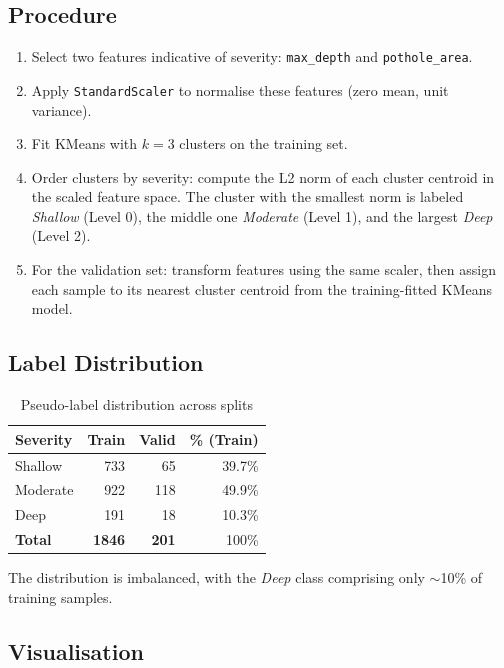 \documentclass[12pt, a4paper]{article}
\begin{document}
\subsection{Procedure}

\begin{enumerate}
    \item Select two features indicative of severity: \texttt{max\_depth} and \texttt{pothole\_area}.
    \item Apply \texttt{StandardScaler} to normalise these features (zero mean, unit variance).
    \item Fit KMeans with $k = 3$ clusters on the training set.
    \item Order clusters by severity: compute the L2 norm of each cluster centroid in the scaled feature space. The cluster with the smallest norm is labeled \textit{Shallow} (Level 0), the middle one \textit{Moderate} (Level 1), and the largest \textit{Deep} (Level 2).
    \item For the validation set: transform features using the same scaler, then assign each sample to its nearest cluster centroid from the training-fitted KMeans model.
\end{enumerate}

\subsection{Label Distribution}

\begin{table}[H]
\centering
\caption{Pseudo-label distribution across splits}
\begin{tabular}{lrrr}
\toprule
\textbf{Severity} & \textbf{Train} & \textbf{Valid} & \textbf{\% (Train)} \\
\midrule
Shallow  & 733  & 65  & 39.7\% \\
Moderate & 922  & 118 & 49.9\% \\
Deep     & 191  & 18  & 10.3\% \\
\midrule
\textbf{Total} & \textbf{1846} & \textbf{201} & 100\% \\
\bottomrule
\end{tabular}
\end{table}

The distribution is imbalanced, with the \textit{Deep} class comprising only $\sim$10\% of training samples.

\subsection{Visualisation}
\end{document}
